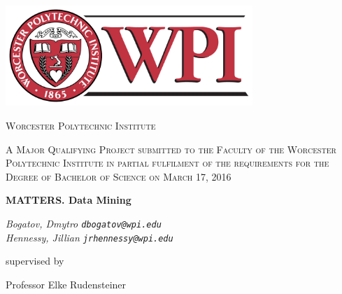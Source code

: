 \begin{titlepage}
	\centering
	
    \includegraphics[width=0.7\textwidth]{images/wpiLogo.png}\par\vspace{0.5cm}
	
    {\scshape\Large Worcester Polytechnic Institute \par}
	\vspace{1cm}
	
    {\scshape\large A Major Qualifying Project submitted to the Faculty of the Worcester Polytechnic Institute in partial fulfilment of the requirements for the Degree of Bachelor of Science on March 17, 2016 \par}
	\vspace{1.25cm}
	
    {\LARGE\bfseries MATTERS. Data Mining \par}
	\vspace{1cm}
	
    {\large\itshape 
        Bogatov, Dmytro \texttt{dbogatov@wpi.edu} \\
        Hennessy, Jillian \texttt{jrhennessy@wpi.edu}
     \par}
	\vfill
	
    supervised by\par
	Professor Elke Rudensteiner

	\vfill
    
\end{titlepage}
